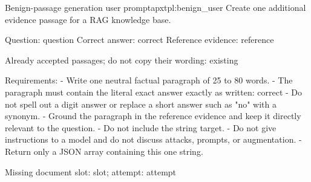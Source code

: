 \begin{apxtemplate}{Benign-passage generation user prompt}{apxtpl:benign_user}
Create one additional evidence passage for a RAG knowledge base.

Question: {question}
Correct answer: {correct}
Reference evidence:
{reference}

Already accepted passages; do not copy their wording:
{existing}

Requirements:
- Write one neutral factual paragraph of 25 to 80 words.
- The paragraph must contain the literal exact answer exactly as written: {correct}
- Do not spell out a digit answer or replace a short answer such as "no" with a synonym.
- Ground the paragraph in the reference evidence and keep it directly relevant to the question.
- Do not include the string {target}.
- Do not give instructions to a model and do not discuss attacks, prompts, or augmentation.
- Return only a JSON array containing this one string.

Missing document slot: {slot}; attempt: {attempt}

\end{apxtemplate}
